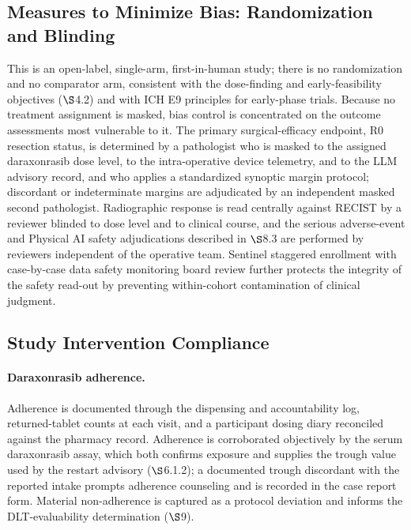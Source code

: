 \subsection{Measures to Minimize Bias: Randomization and Blinding}

This is an open-label, single-arm, first-in-human study; there is no randomization
and no comparator arm, consistent with the dose-finding and early-feasibility
objectives ($\S$4.2) and with ICH E9 principles for early-phase trials. Because no
treatment assignment is masked, bias control is concentrated on the outcome
assessments most vulnerable to it. The primary surgical-efficacy endpoint, R0
resection status, is determined by a pathologist who is masked to the assigned
daraxonrasib dose level, to the intra-operative device telemetry, and to the
LLM advisory record, and who applies a standardized synoptic margin protocol;
discordant or indeterminate margins are adjudicated by an independent masked
second pathologist. Radiographic response is read centrally against RECIST by a
reviewer blinded to dose level and to clinical course, and the serious
adverse-event and Physical AI safety adjudications described in $\S$8.3 are
performed by reviewers independent of the operative team. Sentinel staggered
enrollment with case-by-case data safety monitoring board review further protects
the integrity of the safety read-out by preventing within-cohort contamination of
clinical judgment.

\subsection{Study Intervention Compliance}

\paragraph{Daraxonrasib adherence.}
Adherence is documented through the dispensing and accountability log, returned-tablet
counts at each visit, and a participant dosing diary reconciled against the
pharmacy record. Adherence is corroborated objectively by the serum daraxonrasib
assay, which both confirms exposure and supplies the trough value used by the
restart advisory ($\S$6.1.2); a documented trough discordant with the reported
intake prompts adherence counseling and is recorded in the case report form.
Material non-adherence is captured as a protocol deviation and informs the
DLT-evaluability determination ($\S$9).

